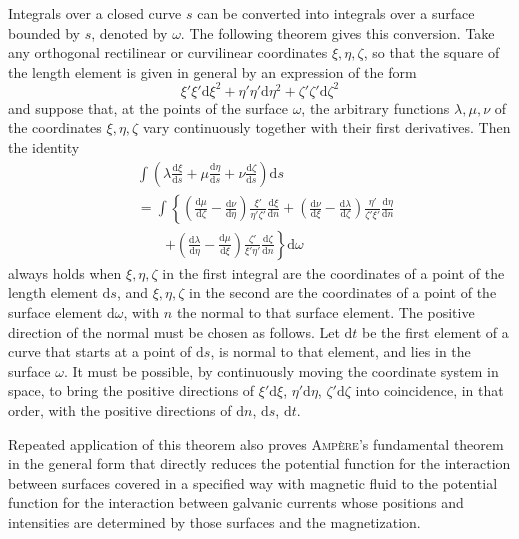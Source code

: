 Integrals over a closed curve $s$ can be converted into integrals over a surface bounded by $s$, denoted by $\omega$. The following theorem gives this conversion. Take any orthogonal rectilinear or curvilinear coordinates $\xi,\eta,\zeta$, so that the square of the length element is given in general by an expression of the form
\[
\xi'\xi'\mathrm d\xi^2+\eta'\eta'\mathrm d\eta^2+\zeta'\zeta'\mathrm d\zeta^2
\]
and suppose that, at the points of the surface $\omega$, the arbitrary functions $\lambda,\mu,\nu$ of the coordinates $\xi,\eta,\zeta$ vary continuously together with their first derivatives. Then the identity
\[
\begin{aligned}
&\int\left(\lambda\frac{\mathrm d\xi}{\mathrm ds}+\mu\frac{\mathrm d\eta}{\mathrm ds}+\nu\frac{\mathrm d\zeta}{\mathrm ds}\right)\mathrm ds\\
&=\int\left\{\left(\frac{\mathrm d\mu}{\mathrm d\zeta}-\frac{\mathrm d\nu}{\mathrm d\eta}\right)\frac{\xi'}{\eta'\zeta'}\frac{\mathrm d\xi}{\mathrm dn}+\left(\frac{\mathrm d\nu}{\mathrm d\xi}-\frac{\mathrm d\lambda}{\mathrm d\zeta}\right)\frac{\eta'}{\zeta'\xi'}\frac{\mathrm d\eta}{\mathrm dn}\right.\\
&\qquad\left.+\left(\frac{\mathrm d\lambda}{\mathrm d\eta}-\frac{\mathrm d\mu}{\mathrm d\xi}\right)\frac{\zeta'}{\xi'\eta'}\frac{\mathrm d\zeta}{\mathrm dn}\right\}\mathrm d\omega
\end{aligned}
\]
always holds when $\xi,\eta,\zeta$ in the first integral are the coordinates of a point of the length element $\mathrm ds$, and $\xi,\eta,\zeta$ in the second are the coordinates of a point of the surface element $\mathrm d\omega$, with $n$ the normal to that surface element. The positive direction of the normal must be chosen as follows. Let $\mathrm dt$ be the first element of a curve that starts at a point of $\mathrm ds$, is normal to that element, and lies in the surface $\omega$. It must be possible, by continuously moving the coordinate system in space, to bring the positive directions of $\xi'\mathrm d\xi$, $\eta'\mathrm d\eta$, $\zeta'\mathrm d\zeta$ into coincidence, in that order, with the positive directions of $\mathrm dn$, $\mathrm ds$, $\mathrm dt$.


Repeated application of this theorem also proves \textsc{Ampère}'s fundamental theorem in the general form that directly reduces the potential function for the interaction between surfaces covered in a specified way with magnetic fluid to the potential function for the interaction between galvanic currents whose positions and intensities are determined by those surfaces and the magnetization.

